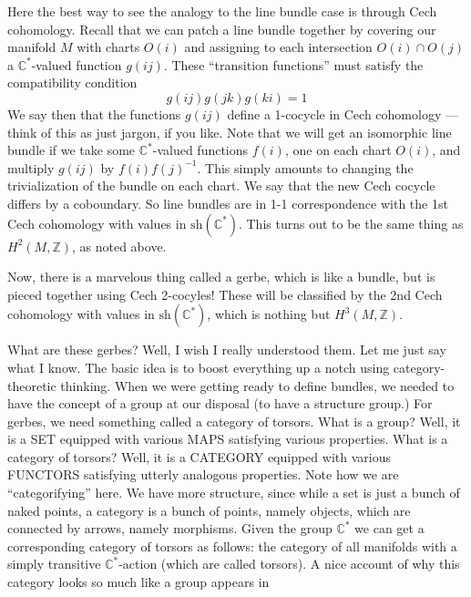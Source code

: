 \documentclass{article}
\def\tightlist{}
\renewcommand{\texttt}[1]{%
  \begingroup
  \ttfamily
  \begingroup\lccode`~=`/\lowercase{\endgroup\def~}{/\discretionary{}{}{}}%
  \begingroup\lccode`~=`[\lowercase{\endgroup\def~}{[\discretionary{}{}{}}%
  \begingroup\lccode`~=`.\lowercase{\endgroup\def~}{.\discretionary{}{}{}}%
  \catcode`/=\active\catcode`[=\active\catcode`.=\active
  \scantokens{#1\noexpand}%
  \endgroup
}
\begin{document}
Here the best way to see the analogy to the line bundle case is through
Cech cohomology. Recall that we can patch a line bundle together by
covering our manifold \(M\) with charts \(O(i)\) and assigning to each
intersection \(O(i) \cap O(j)\) a \(\mathbb{C}^*\)-valued function
\(g(ij)\). These ``transition functions'' must satisfy the compatibility
condition \[g(ij) g(jk) g(ki) = 1\] We say then that the functions
\(g(ij)\) define a 1-cocycle in Cech cohomology --- think of this as
just jargon, if you like. Note that we will get an isomorphic line
bundle if we take some \(\mathbb{C}^*\)-valued functions \(f(i)\), one
on each chart \(O(i)\), and multiply \(g(ij)\) by \(f(i)f(j)^{-1}\).
This simply amounts to changing the trivialization of the bundle on each
chart. We say that the new Cech cocycle differs by a coboundary. So line
bundles are in 1-1 correspondence with the 1st Cech cohomology with
values in \(\mathrm{sh}(\mathbb{C}^*)\). This turns out to be the same
thing as \(H^2(M,\mathbb{Z})\), as noted above.

Now, there is a marvelous thing called a gerbe, which is like a bundle,
but is pieced together using Cech 2-cocyles! These will be classified by
the 2nd Cech cohomology with values in \(\mathrm{sh}(\mathbb{C}^*)\),
which is nothing but \(H^3(M,\mathbb{Z})\).

What are these gerbes? Well, I wish I really understood them. Let me
just say what I know. The basic idea is to boost everything up a notch
using category-theoretic thinking. When we were getting ready to define
bundles, we needed to have the concept of a group at our disposal (to
have a structure group.) For gerbes, we need something called a category
of torsors. What is a group? Well, it is a SET equipped with various
MAPS satisfying various properties. What is a category of torsors? Well,
it is a CATEGORY equipped with various FUNCTORS satisfying utterly
analogous properties. Note how we are ``categorifying'' here. We have
more structure, since while a set is just a bunch of naked points, a
category is a bunch of points, namely objects, which are connected by
arrows, namely morphisms. Given the group \(\mathbb{C}^*\) we can get a
corresponding category of torsors as follows: the category of all
manifolds with a simply transitive \(\mathbb{C}^*\)-action (which are
called torsors). A nice account of why this category looks so much like
a group appears in

\end{document}
